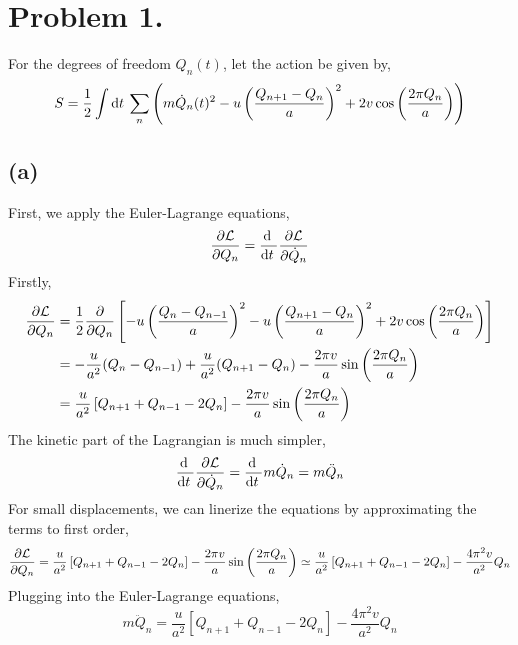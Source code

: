 \documentclass[12pt]{extarticle}
\begin{document}
 
\section*{Problem 1.}
For the degrees of freedom $Q_n(t)$, let the action be given by,
\[ S = \frac{1}{2} \int \mathrm{d}t \: \sum_{n} \left(m \dot{Q}_n(t)^2 - u \left(\frac{Q_{n+1} - Q_{n}}{a}\right)^2 + 2 v \cos{\left(\frac{2 \pi Q_n}{a} \right)} \right)\]  
\subsection*{(a)}
First, we apply the Euler-Lagrange equations,
\[\frac{\partial{\mathcal{L}}}{\partial{Q_n}} = \frac{\mathrm{d} \:}{\mathrm{d}t \:} \frac{\partial{\mathcal{L}}}{\partial{\dot{Q}_n}} \]
Firstly, 
\begin{align*}
\frac{\partial{\mathcal{L}}}{\partial{Q_n}} & = \frac{1}{2} \frac{\partial{}}{\partial{Q_n}} \left[ - u \left(\frac{Q_{n} - Q_{n-1}}{a}\right)^2 - u \left(\frac{Q_{n+1} - Q_{n}}{a}\right)^2 + 2 v \cos{\left(\frac{2 \pi Q_n}{a} \right)} \right] 
\\
& = - \frac{u}{a^2} (Q_n - Q_{n-1}) + \frac{u}{a^2} (Q_{n+1} - Q_{n}) - \frac{2 \pi v}{a} \sin{\left( \frac{2 \pi Q_n}{a} \right)}  
\\
& = \frac{u}{a^2} \left[ Q_{n + 1} + Q_{n - 1} - 2 Q_n \right] - \frac{2 \pi v}{a} \sin{\left( \frac{2 \pi Q_n}{a} \right)}
\end{align*}  
The kinetic part of the Lagrangian is much simpler,
\[\frac{\mathrm{d} \:}{\mathrm{d}t \:} \frac{\partial{\mathcal{L}}}{\partial{\dot{Q}_n}} = \frac{\mathrm{d} \:}{\mathrm{d}t \:} m \dot{Q}_n = m\ddot{Q}_n \]
For small displacements, we can linerize the equations by approximating the terms to first order,
\[ \frac{\partial{\mathcal{L}}}{\partial{Q_n}} = \frac{u}{a^2} \left[ Q_{n + 1} + Q_{n - 1} - 2 Q_n \right] - \frac{2 \pi v}{a} \sin{\left( \frac{2 \pi Q_n}{a} \right)} \simeq \frac{u}{a^2} \left[ Q_{n + 1} + Q_{n - 1} - 2 Q_n \right] - \frac{4 \pi^2 v}{a^2} Q_n  \]
Plugging into the Euler-Lagrange equations,
\[  m\ddot{Q}_n = \frac{u}{a^2} \left[ Q_{n + 1} + Q_{n - 1} - 2 Q_n \right] - \frac{4 \pi^2 v}{a^2} Q_n\]
\end{document}
